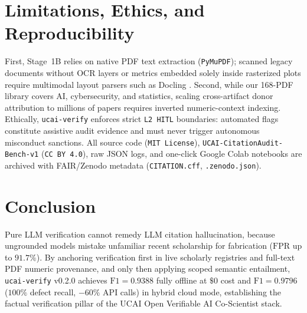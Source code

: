 \documentclass[10pt,twocolumn]{article}
\begin{document}
\section{Limitations, Ethics, and Reproducibility}
First, Stage~1B relies on native PDF text extraction (\texttt{PyMuPDF}); scanned legacy documents without OCR layers or metrics embedded solely inside rasterized plots require multimodal layout parsers such as Docling \cite{livathinos2024docling}. Second, while our 168-PDF library covers AI, cybersecurity, and statistics, scaling cross-artifact donor attribution to millions of papers requires inverted numeric-context indexing. Ethically, \texttt{ucai-verify} enforces strict \texttt{L2 HITL} boundaries: automated flags constitute assistive audit evidence and must never trigger autonomous misconduct sanctions. All source code (\texttt{MIT License}), \texttt{UCAI-CitationAudit-Bench-v1} (\texttt{CC BY 4.0}), raw JSON logs, and one-click Google Colab notebooks are archived with FAIR/Zenodo metadata (\texttt{CITATION.cff}, \texttt{.zenodo.json}).

\section{Conclusion}
Pure LLM verification cannot remedy LLM citation hallucination, because ungrounded models mistake unfamiliar recent scholarship for fabrication ($\mathrm{FPR}$ up to $91.7\%$). By anchoring verification first in live scholarly registries and full-text PDF numeric provenance, and only then applying scoped semantic entailment, \texttt{ucai-verify} v0.2.0 achieves $\mathrm{F1}=0.9388$ fully offline at $\$0$ cost and $\mathrm{F1}=0.9796$ ($100\%$ defect recall, $-60\%$ API calls) in hybrid cloud mode, establishing the factual verification pillar of the UCAI Open Verifiable AI Co-Scientist stack.



\end{document}
